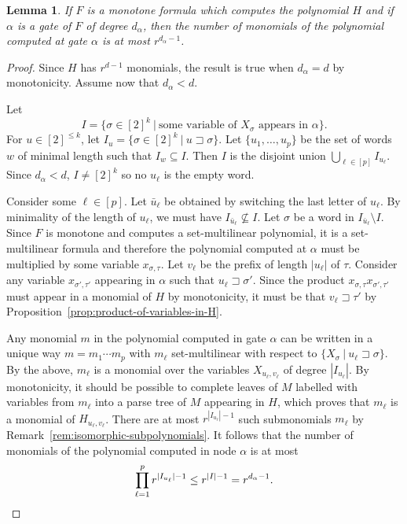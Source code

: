 \documentclass[10pt,a4paper]{article}
\newtheorem{lemma}[theorem]{Lemma}
\newcommand{\prefix}{\sqsupset}
\begin{document}
\begin{lemma}\label{lem:number-of-monomials}
	If \(F\) is a monotone formula which computes the polynomial \(H\) and if \(\alpha\) is a gate of \(F\) of degree \(d_{\alpha}\), then the number of monomials of the polynomial computed at gate \(\alpha\) is at most \(r^{d_{\alpha}-1}\).
\end{lemma}

\begin{proof}
	Since \(H\) has \(r^{d-1}\) monomials, the result is true when \(d_{\alpha} = d\) by monotonicity. Assume now that \(d_{\alpha} < d\). 
	
	Let $$I = \{ \sigma \in [2]^k\ |\ \text{some variable of $X_\sigma$ appears in $\alpha$}\}.$$
	For $u \in [2]^{\leqslant k}$, let $I_u = \{ \sigma \in [2]^k\ |\ u \prefix \sigma\}$.
	Let $\{u_1, \ldots, u_p\}$ be the set of words $w$ of minimal length such that $I_w \subseteq I$.
	Then $I$ is the disjoint union $\bigcup_{\ell \in [p]} I_{u_\ell}$.
	Since $d_\alpha<d$, $I \neq [2]^k$ so no $u_\ell$ is the empty word.
	
	Consider some $\ell \in [p]$.
	Let $\bar{u}_\ell$ be obtained by switching the last letter of $u_\ell$.
	By minimality of the length of $u_\ell$, we must have $I_{\bar{u}_\ell} \nsubseteq I$. 
	Let $\sigma$ be a word in   $I_{\bar{u}_\ell} \setminus I$. 
	Since $F$ is monotone and computes a set-multilinear polynomial, it is a set-multilinear formula
	and therefore the polynomial computed at $\alpha$
	must be multiplied by some variable $x_{\sigma,\tau}$.
	Let $v_\ell$ be the prefix of length $|u_\ell|$ of $\tau$.
	Consider any variable $x_{\sigma',\tau'}$ appearing in $\alpha$ such that $u_\ell \prefix \sigma'$.
	Since the product $x_{\sigma,\tau} x_{\sigma',\tau'}$ must appear in a monomial of $H$ by monotonicity,
	it must be that $v_\ell \prefix \tau'$
	by Proposition~\ref{prop:product-of-variables-in-H}.
	
	
	Any monomial $m$ in the polynomial computed in gate $\alpha$ can be written in a unique way $m=m_1 \cdots m_p$ with $m_\ell$
	set-multilinear with respect to $\{X_{\sigma}\ |\ u_\ell \prefix \sigma\}$.
	By the above, $m_\ell$ is a monomial over the variables $X_{u_\ell,v_\ell}$ of degree $|I_{u_\ell}|$.
	By monotonicity, it should be possible to complete leaves of $M$ labelled with variables from $m_\ell$
	into a parse tree of $M$ appearing in $H$, which proves that 
	$m_\ell$ is a monomial of $H_{u_\ell,v_\ell}$.
	There are at most $r^{|I_{u_\ell}|-1}$ such submonomials $m_\ell$ by Remark~\ref{rem:isomorphic-subpolynomials}.
	It follows that the number of monomials of the polynomial computed in node $\alpha$ is at most
	\[
	\prod_{\ell=1}^p r^{\lvert I_{u_{\ell}} \rvert -1} \leq r^{\lvert I \rvert -1} = r^{d_\alpha-1}.\qedhere
	\]
\end{proof}	
\end{document}

